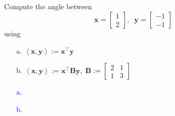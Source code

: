 \documentclass[a4paper,12pt]{article}
\newcommand{\M}[1]{ \begin{bmatrix} #1 \end{bmatrix} }
\newcommand{\vecx}{\textbf{x}}
\newcommand{\vecy}{\textbf{y}}
\newcommand{\matB}{\textbf{B}}
\begin{document}
\subsection{}
Compute the angle between
$$\vecx=\M{1\\2}, \;\; \vecy=\M{-1\\-1}$$
using
\begin{itemize}
 \item [a.] $\left< \vecx, \vecy \right> := \vecx^\top \vecy$
 \item [b.] $\left< \vecx, \vecy \right> := \vecx^\top \matB \vecy, \; \matB := \M{2&1\\1&3}$
\end{itemize}
\textcolor{blue}{
\begin{itemize}
 \item [a.] 
 \item [b.] 
\end{itemize}
}
\end{document}
